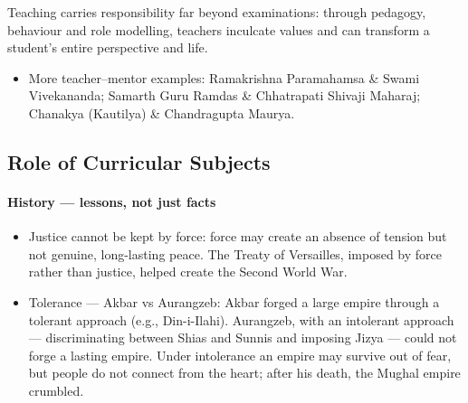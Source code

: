 \begin{KeyConcept}
Teaching carries responsibility far beyond examinations: through pedagogy, behaviour and role modelling, teachers inculcate values and can transform a student's entire perspective and life.
\end{KeyConcept}

\begin{itemize}
\item More teacher--mentor examples: Ramakrishna Paramahamsa \& Swami Vivekananda; Samarth Guru Ramdas \& Chhatrapati Shivaji Maharaj; Chanakya (Kautilya) \& Chandragupta Maurya.
\end{itemize}

\subsection{Role of Curricular Subjects}

\paragraph{History --- lessons, not just facts}
\begin{itemize}
\item Justice cannot be kept by force: force may create an absence of tension but not genuine, long-lasting peace. The Treaty of Versailles, imposed by force rather than justice, helped create the Second World War.
\item Tolerance --- Akbar vs Aurangzeb: Akbar forged a large empire through a tolerant approach (e.g., Din-i-Ilahi). Aurangzeb, with an intolerant approach --- discriminating between Shias and Sunnis and imposing Jizya --- could not forge a lasting empire. Under intolerance an empire may survive out of fear, but people do not connect from the heart; after his death, the Mughal empire crumbled.
\end{itemize}

